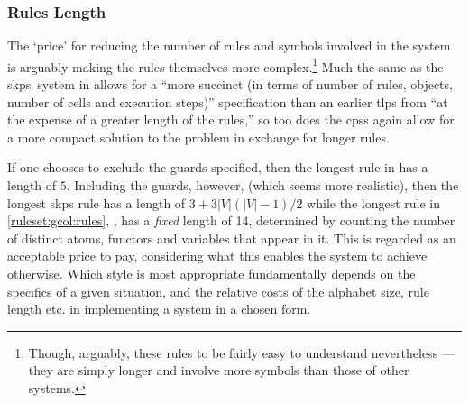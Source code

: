 \subsubsection{Rules Length}
The `price' for reducing the number of rules and symbols involved in the system is arguably making the rules themselves more complex.\footnote{Though, arguably, these rules to be fairly easy to understand nevertheless --- they are simply longer and involve more symbols than those of other systems.}  Much the same as the \gls{skps}~system in \cite{Gheorghe2013} allows for a \enquote{more succinct (in terms of number of rules, objects, number of cells and execution steps)} specification than an earlier \gls{tlps} from \cite{Diaz-Pernil2008} ``at the expense of a greater length of the rules,'' so too does the \glspl{cps} again allow for a more compact solution to the problem in exchange for longer rules.

If one chooses to exclude the guards specified, then the longest rule in \cite{Gheorghe2013} has a length of \(5\).  Including the guards, however, (which seems more realistic), then the longest \gls{skps} rule has a length of \(3 + 3|V|(|V| - 1)/2\) while the longest rule in \cref{ruleset:gcol:rules}, , has a \emph{fixed} length of 14, determined by counting the number of distinct atoms, functors and variables that appear in it.  This is regarded as an acceptable price to pay, considering what this enables the system to achieve otherwise.  Which style is most appropriate fundamentally depends on the specifics of a given situation, and the relative costs of the alphabet size, rule length etc. in implementing a system in a chosen form.